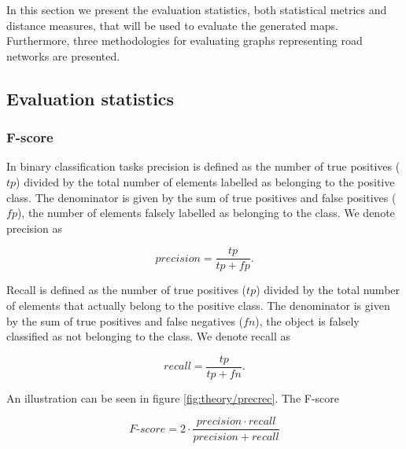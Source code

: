 In this section we present the evaluation statistics, both statistical metrics and distance measures, that will be used to evaluate the generated maps. Furthermore, three methodologies for evaluating graphs representing road networks are presented.

\subsection{Evaluation statistics}
\label{chp:theory.sec:evaluation.sec:stat}

\subsubsection{F-score}
\label{chp:theory.sec:evaluation.sub:stat.sub:fscore}

In binary classification tasks precision is defined as the number of true positives ($tp$) divided by the total number of elements labelled as belonging to the positive class. The denominator is given by the sum of true positives and false positives ($fp$), the number of elements falsely labelled as belonging to the class. We denote precision as

\begin{equation}
    precision = \frac{tp}{tp + fp}.
\end{equation}

Recall is defined as the number of true positives ($tp$) divided by the total number of elements that actually belong to the positive class. The denominator is given by the sum of true positives and false negatives ($fn$), the object is falsely classified as not belonging to the class. We denote recall as

\begin{equation}
    recall = \frac{tp}{tp + fn}.
\end{equation}

An illustration can be seen in figure \ref{fig:theory/precrec}. The F-score 

\begin{equation} \label{eq:fscore}
    F\text{-}score = 2\cdot\frac{precision\cdot recall}{precision + recall}
\end{equation}

